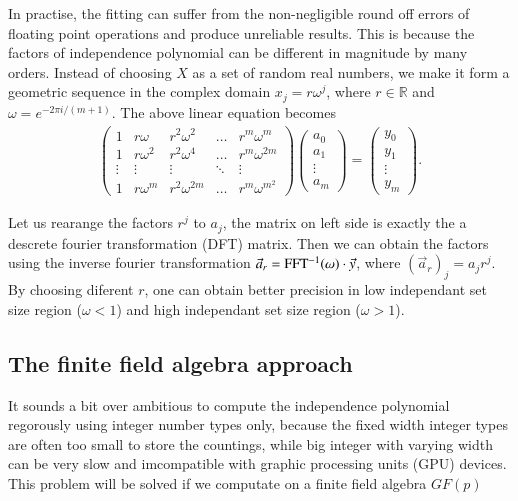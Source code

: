 \documentclass[review,onefignum,onetabnum]{siamart190516}
\newcommand{\<}{\langle}
\renewcommand{\>}{\rangle}
\begin{document}
In practise, the fitting can suffer from the non-negligible round off errors of floating point operations and produce unreliable results.
This is because the factors of independence polynomial can be different in magnitude by many orders.
Instead of choosing $X$ as a set of random real numbers, we make it form a geometric sequence in the complex domain $x_j = r\omega^j$, where $r \in \mathbb{R}$ and $\omega = e^{-2\pi i/(m+1)}$. The above linear equation becomes
\begin{align}
\left(\begin{matrix}
1 & r\omega & r^2\omega^2 & \ldots & r^m\omega^m \\
1 & r\omega^2 & r^2\omega^4 & \ldots & r^m\omega^{2m} \\
\vdots & \vdots & \vdots &\ddots & \vdots \\
1 & r\omega^m & r^2\omega^{2m} & \ldots & r^m\omega^{m^2}
\end{matrix}\right)
\left(\begin{matrix}
a_0 \\ a_1 \\ \vdots \\ a_m
\end{matrix}\right)
= \left(\begin{matrix}
y_0 \\ y_1 \\ \vdots \\ y_m
\end{matrix}\right).
\end{align}

Let us rearange the factors $r^j$ to $a_j$, the matrix on left side is exactly the a descrete fourier transformation (DFT) matrix.
Then we can obtain the factors using the inverse fourier transformation $\vec a_r = {\rm FFT^{-1}}(\omega) \cdot \vec y$, where $(\vec a_r)_j = a_j r ^j$.
By choosing diferent $r$, one can obtain better precision in low independant set size region  ($\omega<1$) and high independant set size region ($\omega>1$).

\subsection{The finite field algebra approach}
It sounds a bit over ambitious to compute the independence polynomial regorously using integer number types only,
because the fixed width integer types are often too small to store the countings,
while big integer with varying width can be very slow and imcompatible with graphic processing units (GPU) devices.
This problem will be solved if we computate on a finite field algebra $GF(p)$
\end{document}
